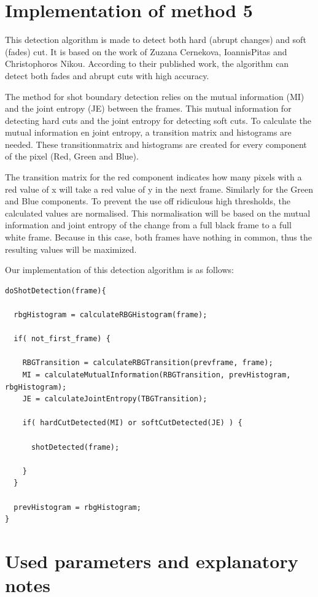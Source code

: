 \documentclass[a4paper,10pt]{article}
\begin{document}


\section{Implementation of method 5}
This detection algorithm is made to detect both hard (abrupt changes) and soft (fades) cut. It is based on the work of Zuzana Cernekova, IoannisPitas and Christophoros Nikou\cite{1564125}. According to their published work, the algorithm can detect both fades and abrupt cuts with high accuracy.

The method for shot boundary detection relies on the mutual information (MI) and the joint entropy (JE) between the frames. This mutual information for detecting hard cuts and the joint entropy for detecting soft cuts. To calculate the mutual information en joint entropy, a transition matrix and histograms are needed. These transitionmatrix and histograms are created for every component of the pixel (Red, Green and Blue). 

The transition matrix for the red component indicates how many pixels with a red value of x will take a red value of y in the next frame. Similarly for the Green and Blue components. To prevent the use off ridiculous high thresholds, the calculated values are normalised. This normalisation will be based on the mutual information and joint entropy of the change from a full black frame to a full white frame. Because in this case, both frames have nothing in common, thus the resulting values will be maximized.

Our implementation of this detection algorithm is as follows:
\begin{lstlisting}
doShotDetection(frame){

  rbgHistogram = calculateRBGHistogram(frame);

  if( not_first_frame) {

    RBGTransition = calculateRBGTransition(prevframe, frame);
    MI = calculateMutualInformation(RBGTransition, prevHistogram, rbgHistogram);
    JE = calculateJointEntropy(TBGTransition);

    if( hardCutDetected(MI) or softCutDetected(JE) ) {

      shotDetected(frame);

    }
  }

  prevHistogram = rbgHistogram;
}
\end{lstlisting}

\section{Used parameters and explanatory notes}
\end{document}
